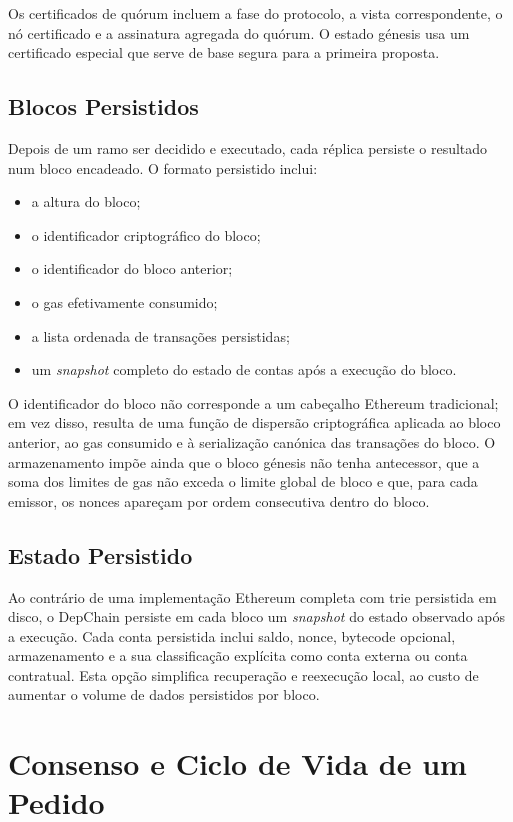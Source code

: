 \documentclass[runningheads]{llncs}
\begin{document}
Os certificados de qu\'orum incluem a fase do protocolo, a vista correspondente, o n\'o certificado e a assinatura agregada do qu\'orum. O estado g\'enesis usa um certificado especial que serve de base segura para a primeira proposta.

\subsection{Blocos Persistidos}
Depois de um ramo ser decidido e executado, cada r\'eplica persiste o resultado num bloco encadeado. O formato persistido inclui:
\begin{itemize}
\item a altura do bloco;
\item o identificador criptogr\'afico do bloco;
\item o identificador do bloco anterior;
\item o gas efetivamente consumido;
\item a lista ordenada de transa\c{c}\~oes persistidas;
\item um \textit{snapshot} completo do estado de contas ap\'os a execu\c{c}\~ao do bloco.
\end{itemize}

O identificador do bloco n\~ao corresponde a um cabe\c{c}alho Ethereum tradicional; em vez disso, resulta de uma fun\c{c}\~ao de dispers\~ao criptogr\'afica aplicada ao bloco anterior, ao gas consumido e \`a serializa\c{c}\~ao can\'onica das transa\c{c}\~oes do bloco. O armazenamento imp\~oe ainda que o bloco g\'enesis n\~ao tenha antecessor, que a soma dos limites de gas n\~ao exceda o limite global de bloco e que, para cada emissor, os nonces apare\c{c}am por ordem consecutiva dentro do bloco.

\subsection{Estado Persistido}
Ao contr\'ario de uma implementa\c{c}\~ao Ethereum completa com trie persistida em disco, o DepChain persiste em cada bloco um \textit{snapshot} do estado observado ap\'os a execu\c{c}\~ao. Cada conta persistida inclui saldo, nonce, bytecode opcional, armazenamento e a sua classifica\c{c}\~ao expl\'icita como conta externa ou conta contratual. Esta op\c{c}\~ao simplifica recupera\c{c}\~ao e reexecu\c{c}\~ao local, ao custo de aumentar o volume de dados persistidos por bloco.

\section{Consenso e Ciclo de Vida de um Pedido}
\end{document}

